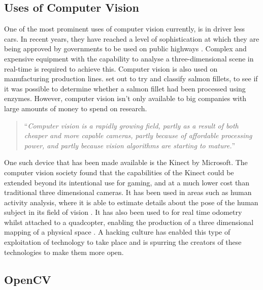 \documentclass[11pt,oneside]{report}
\begin{document}
			\subsection{Uses of Computer Vision}
				One of the most prominent uses of computer vision currently, is in driver less cars.
				In recent years, they have reached a level of sophistication at which they are being approved by governments to be used on public highways \cite{web:driverlessCars}.
				Complex and expensive equipment with the capability to analyse a three-dimensional scene in real-time is required to achieve this.
				Computer vision is also used on manufacturing production lines.
				 set out to try and classify salmon fillets, to see if it was possible to determine whether a salmon fillet had been processed using enzymes. %
				However, computer vision isn't only available to big companies with large amounts of money to spend on research.
				\begin{quote}
				``\textit{Computer vision is a rapidly growing field, partly as a result of both cheaper and more capable cameras, partly because of affordable processing power, and partly because vision algorithms are starting to mature.}''\cite[p. ix]{definition:cv}
				\end{quote}
				One such device that has been made available is the Kinect by Microsoft.
				The computer vision society found that the capabilities of the Kinect could be extended beyond its intentional use for gaming, and at a much lower cost than traditional three dimensional cameras.
				It has been used in areas such as human activity analysis, where it is able to estimate details about the pose of the human subject in its field of vision \cite{kinect:1}.
				It has also been used to for real time odometry whilst attached to a quadcopter, enabling the production of a three dimensional mapping of a physical space \cite{kinect:2}.
				A hacking culture has enabled this type of exploitation of technology to take place and is spurring the creators of these technologies to make them more open.
				
			\subsection{OpenCV}
			
\end{document}

